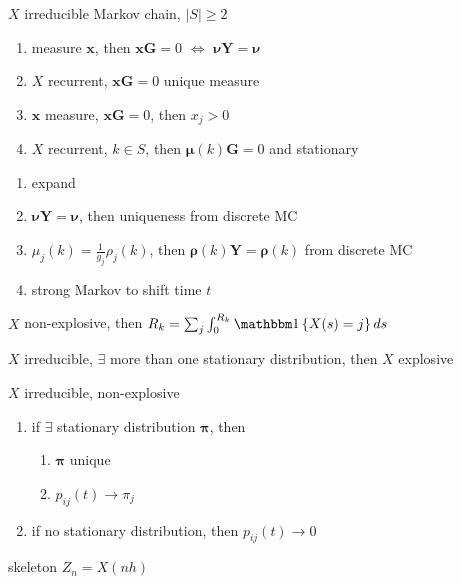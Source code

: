 \begin{lemma}\label{lemma:sta}
    $X$ irreducible Markov chain, $|S|\geq 2$
    \begin{enumerate}
        \item measure $\bm x$, then $\bm x \bm G = 0$ $\iff$ $\bm \nu \bm Y= \bm \nu$
        \item $X$ recurrent, $\bm x \bm G = 0$ unique measure
        \item $\bm x$ measure, $\bm x \bm G = 0$, then $x_j > 0$
        \item $X$ recurrent, $k \in S$, then $\bm \mu(k) \bm G = 0$ and stationary \label{lemma:sta4}
    \end{enumerate}
\end{lemma}
\begin{pf}
    \begin{enumerate}
        \item expand
        \item $\bm \nu \bm Y= \bm \nu$, then uniqueness from discrete MC
        \item $\mu_j(k) = \frac{1}{g_j}\rho_j(k)$, then $\bm \rho(k) \bm Y = \bm \rho (k)$ from discrete MC
        \item strong Markov to shift time $t$
    \end{enumerate}
\end{pf}

\begin{fact}
    $X$ non-explosive, then $R_k = \sum_j \int_0^{R_k} \In \left\{ X(s) = j \right\}ds$
\end{fact}

\begin{fact}
    $X$ irreducible, $\exists$ more than one stationary distribution, then $X$ explosive
\end{fact}

\begin{thm}
    $X$ irreducible, non-explosive
    \begin{enumerate}
        \item if $\exists$ stationary distribution $\bm\pi$, then
        \begin{enumerate}
            \item $\bm\pi$ unique
            \item $p_{ij}(t) \rightarrow \pi_j$
        \end{enumerate}
        \item if no stationary distribution, then $p_{ij}(t) \rightarrow 0$
    \end{enumerate}
\end{thm}
\begin{pf}
    skeleton $Z_n = X(nh)$
\end{pf}

